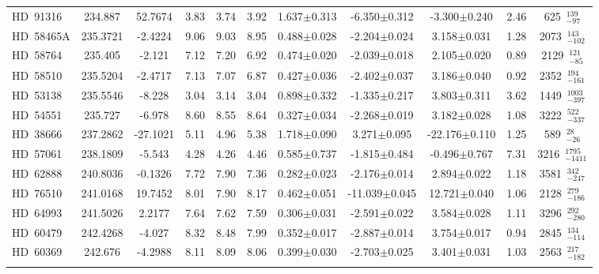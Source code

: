 {\begin{longtable}{lcccccccccc}
\noalign{\smallskip}
HD~91316 & 234.887 & 52.7674 & 3.83 & 3.74 & 3.92 & 1.637$\pm$0.313 & -6.350$\pm$0.312 & -3.300$\pm$0.240 & 2.46 & 625~$_{-97}^{139}$ \\
\noalign{\smallskip}
HD~58465A & 235.3721 & -2.4224 & 9.06 & 9.03 & 8.95 & 0.488$\pm$0.028 & -2.204$\pm$0.024 & 3.158$\pm$0.031 & 1.28 & 2073~$_{-102}^{143}$ \\
\noalign{\smallskip}
HD~58764 & 235.405 & -2.121 & 7.12 & 7.20 & 6.92 & 0.474$\pm$0.020 & -2.039$\pm$0.018 & 2.105$\pm$0.020 & 0.89 & 2129~$_{-85}^{121}$ \\
\noalign{\smallskip}
HD~58510 & 235.5204 & -2.4717 & 7.13 & 7.07 & 6.87 & 0.427$\pm$0.036 & -2.402$\pm$0.037 & 3.186$\pm$0.040 & 0.92 & 2352~$_{-161}^{194}$ \\
\noalign{\smallskip}
HD~53138 & 235.5546 & -8.228 & 3.04 & 3.14 & 3.04 & 0.898$\pm$0.332 & -1.335$\pm$0.217 & 3.803$\pm$0.311 & 3.62 & 1449~$_{-397}^{1003}$ \\
\noalign{\smallskip}
HD~54551 & 235.727 & -6.978 & 8.60 & 8.55 & 8.64 & 0.327$\pm$0.034 & -2.268$\pm$0.019 & 3.182$\pm$0.028 & 1.08 & 3222~$_{-337}^{522}$ \\
\noalign{\smallskip}
HD~38666 & 237.2862 & -27.1021 & 5.11 & 4.96 & 5.38 & 1.718$\pm$0.090 & 3.271$\pm$0.095 & -22.176$\pm$0.110 & 1.25 & 589~$_{-26}^{28}$ \\
\noalign{\smallskip}
HD~57061 & 238.1809 & -5.543 & 4.28 & 4.26 & 4.46 & 0.585$\pm$0.737 & -1.815$\pm$0.484 & -0.496$\pm$0.767 & 7.31 & 3216~$_{-1411}^{1795}$ \\
\noalign{\smallskip}
HD~62888 & 240.8036 & -0.1326 & 7.72 & 7.90 & 7.36 & 0.282$\pm$0.023 & -2.176$\pm$0.014 & 2.894$\pm$0.022 & 1.18 & 3581~$_{-247}^{342}$ \\
\noalign{\smallskip}
HD~76510 & 241.0168 & 19.7452 & 8.01 & 7.90 & 8.17 & 0.462$\pm$0.051 & -11.039$\pm$0.045 & 12.721$\pm$0.040 & 1.06 & 2128~$_{-186}^{279}$ \\
\noalign{\smallskip}
HD~64993 & 241.5026 & 2.2177 & 7.64 & 7.62 & 7.59 & 0.306$\pm$0.031 & -2.591$\pm$0.022 & 3.584$\pm$0.028 & 1.11 & 3296~$_{-280}^{292}$ \\
\noalign{\smallskip}
HD~60479 & 242.4268 & -4.027 & 8.32 & 8.48 & 7.99 & 0.352$\pm$0.017 & -2.887$\pm$0.014 & 3.754$\pm$0.017 & 0.94 & 2845~$_{-114}^{134}$ \\
\noalign{\smallskip}
HD~60369 & 242.676 & -4.2988 & 8.11 & 8.09 & 8.06 & 0.399$\pm$0.030 & -2.703$\pm$0.025 & 3.401$\pm$0.031 & 1.03 & 2563~$_{-182}^{217}$ \\
\noalign{\smallskip}

\end{longtable}}
